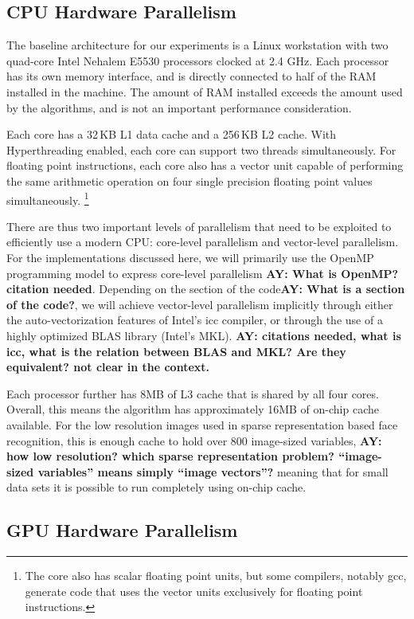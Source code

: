 \documentclass[10pt,twocolumn,letterpaper]{article}
\begin{document}
\subsection{CPU Hardware Parallelism} 
The baseline architecture for our experiments is a Linux workstation with two quad-core Intel Nehalem E5530 processors clocked at 2.4 GHz.  Each
processor has its own memory interface, and is directly connected to half of
the RAM installed in the machine.  The amount of RAM installed exceeds the
amount used by the algorithms, and is not an important performance
consideration.  

Each core has a 32\,KB L1 data cache and a 256\,KB L2 cache. With Hyperthreading
enabled, each core can support two threads simultaneously.  For floating point
instructions, each core also has a vector unit capable of performing the same
arithmetic operation on four single precision floating point values
simultaneously.  \footnote{The core also has scalar floating point units, but
some compilers, notably gcc, generate code that uses the vector units
exclusively for floating point instructions.} 

There are thus two important levels of parallelism that need to be exploited to efficiently
use a modern CPU: core-level parallelism and vector-level
parallelism.  For the implementations discussed here, we will primarily use the
OpenMP programming model to express core-level parallelism {\bf AY: What is OpenMP? citation needed}.  Depending on the
section of the code{\bf AY: What is a section of the code?}, we will achieve vector-level parallelism implicitly
through either the auto-vectorization features of Intel's icc compiler, or
through the use of a highly optimized BLAS library (Intel's MKL). {\bf AY: citations needed, what is icc, what is the relation between BLAS and MKL? Are they equivalent? not clear in the context.}

Each processor further has 8MB of L3 cache that is shared by all four cores.  Overall,
this means the algorithm has approximately 16MB of on-chip cache available.
For the low resolution images used in sparse representation based face
recognition, this is enough cache to hold over 800 image-sized variables, {\bf AY: how low resolution? which sparse representation problem? ``image-sized variables'' means simply ``image vectors''?}
meaning that for small data sets it is possible to run completely using on-chip
cache.

\subsection{GPU Hardware Parallelism}
\end{document}

